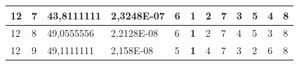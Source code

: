 \documentclass[conference]{IEEEtran}
\begin{document}
\begin{table}[]
\begin{tabular}{|llll|llllllll|}
\multicolumn{1}{|l|}{12}                                                    & \multicolumn{1}{l|}{7}                                                        & \multicolumn{1}{l|}{43,8111111}                                                   & 2,3248E-07                     & \multicolumn{1}{l|}{6}                                                  & \multicolumn{1}{l|}{\textbf{1}}                                         & \multicolumn{1}{l|}{2}                                                  & \multicolumn{1}{l|}{7}                                                  & \multicolumn{1}{l|}{3}                                                  & \multicolumn{1}{l|}{5}                                                  & \multicolumn{1}{l|}{4}                                                  & 8                          \\ \hline
\multicolumn{1}{|l|}{12}                                                    & \multicolumn{1}{l|}{8}                                                        & \multicolumn{1}{l|}{49,0555556}                                                   & 2,2128E-08                     & \multicolumn{1}{l|}{6}                                                  & \multicolumn{1}{l|}{\textbf{1}}                                         & \multicolumn{1}{l|}{2}                                                  & \multicolumn{1}{l|}{7}                                                  & \multicolumn{1}{l|}{4}                                                  & \multicolumn{1}{l|}{5}                                                  & \multicolumn{1}{l|}{3}                                                  & 8                          \\ \hline
\multicolumn{1}{|l|}{12}                                                    & \multicolumn{1}{l|}{9}                                                        & \multicolumn{1}{l|}{49,1111111}                                                   & 2,158E-08                      & \multicolumn{1}{l|}{5}                                                  & \multicolumn{1}{l|}{\textbf{1}}                                         & \multicolumn{1}{l|}{4}                                                  & \multicolumn{1}{l|}{7}                                                  & \multicolumn{1}{l|}{3}                                                  & \multicolumn{1}{l|}{2}                                                  & \multicolumn{1}{l|}{6}                                                  & 8                          \\ \hline

\end{tabular}
\end{table}
\end{document}
